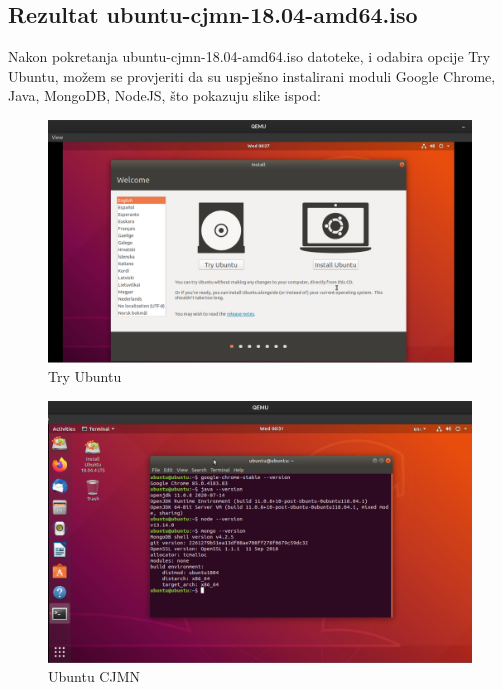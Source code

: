 \documentclass[12pt,vi]{mitthesis}
\begin{document}
\subsection*{Rezultat ubuntu-cjmn-18.04-amd64.iso}
\indent
Nakon pokretanja ubuntu-cjmn-18.04-amd64.iso datoteke, i odabira opcije Try Ubuntu, možem se provjeriti da su uspješno instalirani moduli Google Chrome, Java, MongoDB, NodeJS, što pokazuju slike ispod:
\begin{figure}[!htb]
\centering
\includegraphics[width=\linewidth]{images/tryUbuntu.png}
\caption{Try Ubuntu}
\end{figure}
\begin{figure}[!htb]
\centering
\includegraphics[width=\linewidth]{images/ubuntu-cjmn.png}
\caption{Ubuntu CJMN}
\end{figure}
\end{document}
